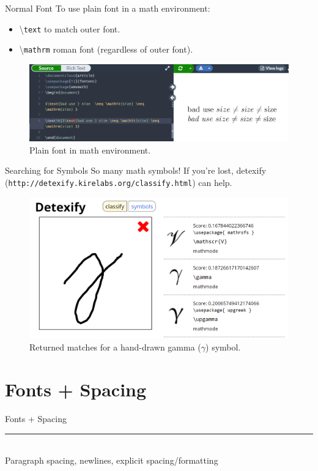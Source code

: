 \documentclass{beamer}
\begin{document}
{  \begin{frame}{Normal Font}
    To use plain font in a math environment:
    \begin{itemize} 
      \item \textbackslash\texttt{text} to match outer font.
      \item \textbackslash\texttt{mathrm} roman font (regardless of outer font).
    \end{itemize}
    \begin{figure}
      \includegraphics[width=0.8\linewidth]{day02-01I-plain.png}
      \caption{Plain font in math environment.}
      \label{fig:day02-01I}
    \end{figure}
  \end{frame}

  \begin{frame}{Searching for Symbols}
    So many math symbols! If you're lost, detexify (\texttt{http://detexify.kirelabs.org/classify.html}) can help.
    \begin{figure}
      \includegraphics[width=0.8\linewidth]{day02-01J-detexify.png}
      \caption{Returned matches for a hand-drawn gamma ($\gamma$) symbol.}
      \label{fig:day02-01J}
    \end{figure}
  \end{frame}

\section{Fonts + Spacing}

  \begin{frame}[plain]
    \vfill
    \centering
    \begin{beamercolorbox}[sep=8pt,center,shadow=true,rounded=true]{Fonts + Spacing}
      \insertsectionhead\par%
      \color{davisblue}\noindent\rule{10cm}{1pt} \\
      \footnotesize{Paragraph spacing, newlines, explicit spacing/formatting}
    \end{beamercolorbox}
    \vfill
  \end{frame}

}
\end{document}
